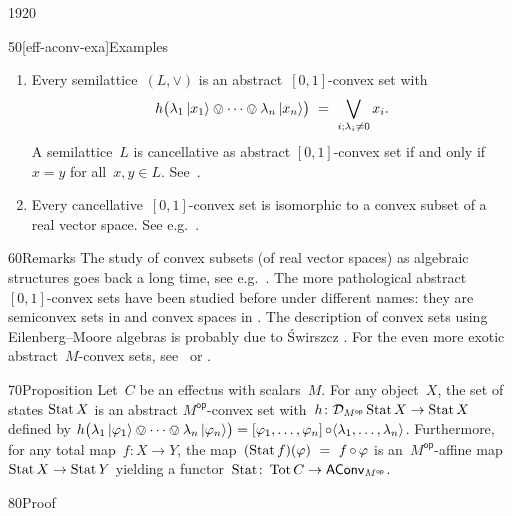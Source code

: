 \begin{parsec}{1920}
\begin{point}{50}[eff-aconv-exa]{Examples}
\begin{enumerate}
\begin{equation*}
\begin{tikzpicture}[scale=0.2]
    \draw (0,0) -- (0,1) ; 
    \draw (1,0) -- (0,0) ; 
\end{tikzpicture}.
\end{equation*}
\item
Every semilattice~$(L, \vee)$
    is an abstract~$[0,1]$-convex set
    with
    \begin{equation*}
    h\bigl(\lambda_1 \ket{x_1} \ovee \cdots \ovee \lambda_n \ket{x_n}\bigr)
        \ =\  \bigvee_{i; \lambda_i \neq 0} x_i.
    \end{equation*}
    A semilattice~$L$ is cancellative as abstract $[0,1]$-convex set
    if and only if~$x=y$ for all~$x,y\in L$.
    See~\cite{neumann1970quasivariety}.
\item
Every cancellative~$[0,1]$-convex set
    is isomorphic to a convex subset of a real vector space.
    See e.g.~\cite[thm.~8]{statesofconvexsets}.
\end{enumerate}
\spacingfix{}
\begin{point}{60}{Remarks}%
The study of
    convex subsets (of real vector spaces)
    as algebraic structures goes back a long time,
        see e.g.~\cite{stone1949postulates,neumann1970quasivariety,flood1981semiconvex,tz2009convex,gudder1979general}.
The more pathological abstract~$[0,1]$-convex sets have been studied before
    under different names:
    they are semiconvex sets in \cite{flood1981semiconvex,swirszcz1975monadic} and
    convex spaces in \cite{tz2009convex}.
The description of convex sets using Eilenberg--Moore algebras is probably
    due to \'Swirszcz \cite{swirszcz1975monadic}.
For the even more exotic abstract~$M$-convex
    sets, see~\cite{effintro} or
        \cite{probdistrconv}.
\end{point}
\end{point}
\begin{point}{70}{Proposition}%
Let~$C$ be an effectus with scalars~$M$.
For any object~$X$, the set of states
$\operatorname{Stat} X$ is an abstract $M^{\mathsf{op}}$-convex set
with~$h\colon \mathcal{D}_{M^{\mathsf{op}}} \operatorname{Stat} X \to \operatorname{Stat} X$
    defined by
    $h\bigl( \lambda_1 \ket{\varphi_1} \ovee \cdots \ovee \lambda_n \ket{\varphi_n} \bigr)
     =  [\varphi_1, \ldots, \varphi_n] \mathop{\circ} \langle
                    \lambda_1, \ldots, \lambda_n\rangle$.
Furthermore,
    for any total map~$f\colon X \to Y$,
    the map~$ (\operatorname{Stat} f)(\varphi) \ = \ f \mathop{\circ} \varphi$
    is an~$M^{\mathsf{op}}$-affine map~$\operatorname{Stat} X \to \operatorname{Stat} Y$ yielding a
    functor~$\operatorname{Stat} \colon \operatorname{Tot} C \to \mathsf{AConv}_{M^{\mathsf{op}}}$.~\cite{effintro}
\begin{point}{80}{Proof}%

\end{point}
\end{point}
\end{parsec}
